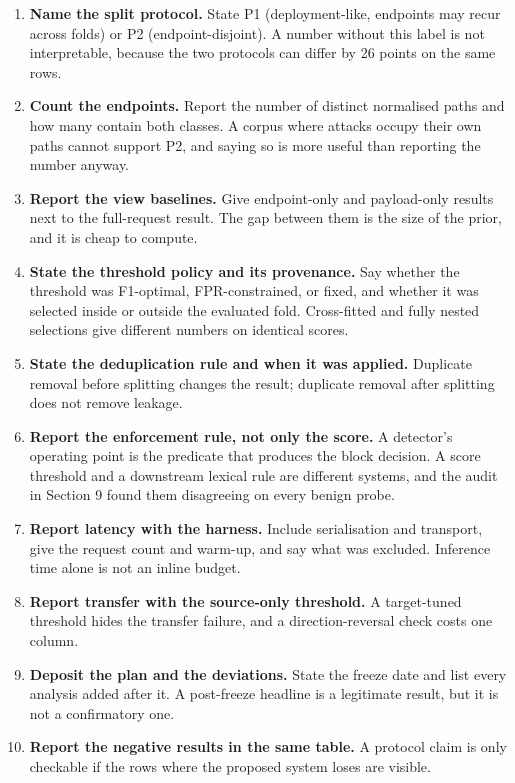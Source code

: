 \documentclass[preprint,11pt]{elsarticle}
\providecommand{\tightlist}{}
\begin{document}
\begin{enumerate}
\def\labelenumi{\arabic{enumi}.}
\tightlist
\item
  \textbf{Name the split protocol.} State P1 (deployment-like, endpoints
  may recur across folds) or P2 (endpoint-disjoint). A number without
  this label is not interpretable, because the two protocols can differ
  by 26 points on the same rows.
\item
  \textbf{Count the endpoints.} Report the number of distinct normalised
  paths and how many contain both classes. A corpus where attacks occupy
  their own paths cannot support P2, and saying so is more useful than
  reporting the number anyway.
\item
  \textbf{Report the view baselines.} Give endpoint-only and
  payload-only results next to the full-request result. The gap between
  them is the size of the prior, and it is cheap to compute.
\item
  \textbf{State the threshold policy and its provenance.} Say whether
  the threshold was F1-optimal, FPR-constrained, or fixed, and whether
  it was selected inside or outside the evaluated fold. Cross-fitted and
  fully nested selections give different numbers on identical scores.
\item
  \textbf{State the deduplication rule and when it was applied.}
  Duplicate removal before splitting changes the result; duplicate
  removal after splitting does not remove leakage.
\item
  \textbf{Report the enforcement rule, not only the score.} A detector's
  operating point is the predicate that produces the block decision. A
  score threshold and a downstream lexical rule are different systems,
  and the audit in Section 9 found them disagreeing on every benign
  probe.
\item
  \textbf{Report latency with the harness.} Include serialisation and
  transport, give the request count and warm-up, and say what was
  excluded. Inference time alone is not an inline budget.
\item
  \textbf{Report transfer with the source-only threshold.} A
  target-tuned threshold hides the transfer failure, and a
  direction-reversal check costs one column.
\item
  \textbf{Deposit the plan and the deviations.} State the freeze date
  and list every analysis added after it. A post-freeze headline is a
  legitimate result, but it is not a confirmatory one.
\item
  \textbf{Report the negative results in the same table.} A protocol
  claim is only checkable if the rows where the proposed system loses
  are visible.
\end{enumerate}
\end{document}
